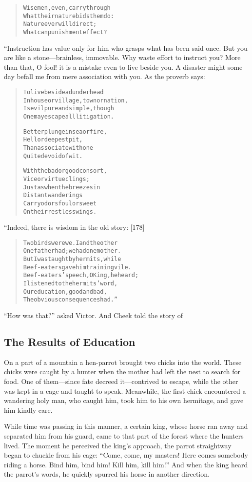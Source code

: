 \documentclass[article, twoside, 14pt]{memoir}
\renewenvironment{verbatim}{%
\begin{quote}%
\vskip -10pt%
\begin{alltt}\normalfont\large}{\end{alltt}%
\end{quote}%
\vskip -10pt
} %
\begin{document}
\begin{verbatim}
Wise men, even, carry through
What their nature bids them do:
Nature ever will direct;
What can punishment effect?
\end{verbatim}
“Instruction has value only for him who grasps what has been said
once. But you are like a stone---brainless, immovable. Why waste
effort to instruct you? More than that, O fool! it is a mistake
even to live beside you. A disaster might some day befall me from
mere association with you. As the proverb says:

\begin{verbatim}
To live beside a dunderhead
    In house or village, town or nation,
Is evil pure and simple, though
    One may escape all litigation.

Better plunge in sea or fire,
    Hell or deepest pit,
Than associate with one
    Quite devoid of wit.

With the bad or good consort,
    Vice or virtue clings;
Just as when the breezes in
    Distant wanderings
Carry odors foul or sweet
    On their restless wings.
\end{verbatim}
“Indeed, there is wisdom in the old story: [178]

\begin{verbatim}
Two birds were we. I and the other
One father had; we had one mother.
But I was taught by hermits, while
Beef-eaters gave him training vile.
Beef-eaters' speech, O King, he heard;
I listened to the hermits' word,
Our education, good and bad,
The obvious consequences had.”
\end{verbatim}
``How was that?'' asked Victor. And Cheek told the story of

\subsection{The Results of Education}

\label{s32}

On a part of a mountain a hen-parrot brought two chicks into the
world. These chicks were caught by a hunter when the mother had
left the nest to search for food. One of them---since fate decreed
it---contrived to escape, while the other was kept in a cage and
taught to speak. Meanwhile, the first chick encountered a wandering
holy man, who caught him, took him to his own hermitage, and gave
him kindly care.

While time was passing in this manner, a certain king, whose horse
ran away and separated him from his guard, came to that part of the
forest where the hunters lived. The moment he perceived the king's
approach, the parrot straightway began to chuckle from his cage:
``Come, come, my masters! Here comes somebody riding a horse. Bind him, bind him! Kill him, kill him!''
And when the king heard the parrot's words, he quickly spurred his
horse in another direction.
\end{document}
